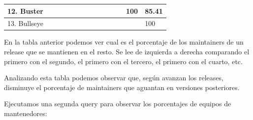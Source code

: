 \documentclass[a4paper, 12pt]{book}
\begin{document}
\begin{table}[htbp]
{\begin{tabular}{|l|l|l|l|l|l|l|l|l|l|l|l|l|l|}
				12. Buster   & \cellcolor[HTML]{000000} & \cellcolor[HTML]{000000} & \cellcolor[HTML]{000000} & \cellcolor[HTML]{000000} & \cellcolor[HTML]{000000} & \cellcolor[HTML]{000000} & \cellcolor[HTML]{000000} & \cellcolor[HTML]{000000} & \cellcolor[HTML]{000000} & \cellcolor[HTML]{000000} & \cellcolor[HTML]{000000} & 100                      & 85.41        \\ \hline
				13. Bullseye & \cellcolor[HTML]{000000} & \cellcolor[HTML]{000000} & \cellcolor[HTML]{000000} & \cellcolor[HTML]{000000} & \cellcolor[HTML]{000000} & \cellcolor[HTML]{000000} & \cellcolor[HTML]{000000} & \cellcolor[HTML]{000000} & \cellcolor[HTML]{000000} & \cellcolor[HTML]{000000} & \cellcolor[HTML]{000000} & \cellcolor[HTML]{000000} & 100          \\ \hline
		\end{tabular}}
	\end{table}
	
	En la tabla anterior podemos ver cual es el porcentaje de los maintainers de un release que se mantienen en el resto. Se lee de izquierda a derecha comparando el primero con el segundo, el primero con el tercero, el primero con el cuarto, etc.
	
	Analizando esta tabla podemos observar que, según avanzan los releases, disminuye el porcentaje de maintainers que aguantan en versiones posteriores.
	
	Ejecutamos una segunda query para observar los porcentajes de equipos de mantenedores:
	
\end{document}
